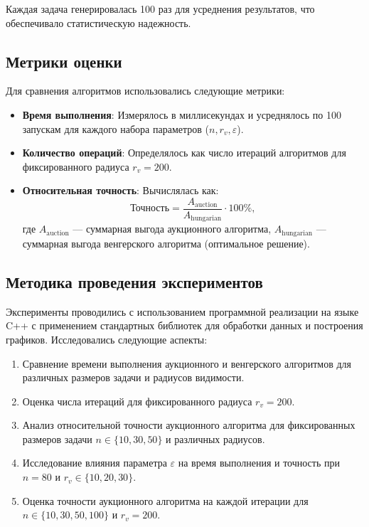 Каждая задача генерировалась 100 раз для усреднения результатов, что обеспечивало статистическую надежность.

\subsection{Метрики оценки}

\vspace{0.3cm}

Для сравнения алгоритмов использовались следующие метрики:

\begin{itemize}
    \item \textbf{Время выполнения}: Измерялось в миллисекундах и усреднялось по 100 запускам для каждого набора параметров (\( n, r_v, \varepsilon \)).
    \item \textbf{Количество операций}: Определялось как число итераций алгоритмов для фиксированного радиуса \( r_v = 200 \).
    \item \textbf{Относительная точность}: Вычислялась как:
    \[
    \text{Точность} = \frac{A_{\text{auction}}}{A_{\text{hungarian}}} \cdot 100\%,
    \]
    где \( A_{\text{auction}} \) --- суммарная выгода аукционного алгоритма, \( A_{\text{hungarian}} \) --- суммарная выгода венгерского алгоритма (оптимальное решение).
\end{itemize}

\subsection{Методика проведения экспериментов}

Эксперименты проводились с использованием программной реализации на языке C++ с применением стандартных библиотек для обработки данных и построения графиков. Исследовались следующие аспекты:

\begin{enumerate}
    \item Сравнение времени выполнения аукционного и венгерского алгоритмов для различных размеров задачи и радиусов видимости.
    \item Оценка числа итераций для фиксированного радиуса \( r_v = 200 \).
    \item Анализ относительной точности аукционного алгоритма для фиксированных размеров задачи \( n \in \{10, 30, 50\} \) и различных радиусов.
    \item Исследование влияния параметра \( \varepsilon \) на время выполнения и точность при \( n = 80 \) и \( r_v \in \{10, 20, 30\} \).
    \item Оценка точности аукционного алгоритма на каждой итерации для \( n \in \{10, 30, 50, 100\} \) и \( r_v = 200 \).
\end{enumerate}

